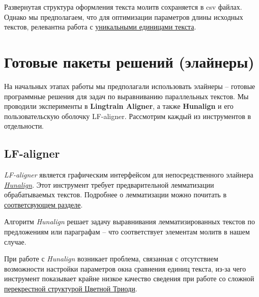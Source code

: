 \documentclass[
  letterpaper,
]{book}
\begin{document}
Развернутая структура оформления текста молитв сохраняется в csv файлах.
Однако мы предполагаем, что для оптимизации параметров длины исходных
текстов, релевантна работа с
\href{https://github.com/Drozhzhinastya/GSPC/tree/main/texts/unique_units}{уникальными
единицами текста}.


\hypertarget{sec-about_aligners}{%
\chapter{Готовые пакеты решений (элайнеры)}\label{sec-about_aligners}}

На начальных этапах работы мы предполагали использовать элайнеры --
готовые программные решения для задач по выравниванию параллельных
текстов. Мы проводили эксперименты в \textbf{Lingtrain Aligner}, а также
\textbf{Hunalign} и его пользовательскую оболочку LF-aligner. Рассмотрим
каждый из инструментов в отдельности.

\hypertarget{sec-lf_aligner}{%
\section{LF-aligner}\label{sec-lf_aligner}}

\emph{LF-aligner} является графическим интерфейсом для непосредственного
элайнера
\emph{\href{https://github.com/danielvarga/hunalign}{Hunalign}}. Этот
инструмент требует предварительной лемматизации обрабатываемых текстов.
Подробнее о лемматизации можно почитать в
\protect\hyperlink{ux43bux435ux43cux43cux430ux442ux438ux437ux430ux446ux438ux44f}{соответсвующем
разделе}.

Алгоритм \emph{Hunalign} решает задачу выравнивания лемматизированных
текстов по предложениям или параграфам -- что соответствует элементам
молитв в нашем случае.

При работе с \emph{Hunalign} возникает проблема, связанная с отсутствием
возможности настройки параметров окна сравнения единиц текста, из-за
чего инструмент показывает крайне низкое качество сведения при работе со
сложной \protect\hyperlink{sec-element_order}{перекрестной структурой
Цветной Триоди}.
\end{document}
